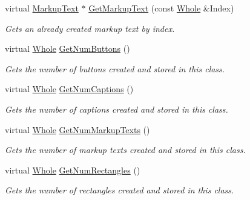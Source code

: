 \begin{DoxyCompactItemize}
virtual \hyperlink{classMezzanine_1_1UI_1_1MarkupText}{MarkupText} $\ast$ \hyperlink{classMezzanine_1_1UI_1_1RenderableContainerWidget_a7454e3b8a2864d207d30d143eb198df1}{GetMarkupText} (const \hyperlink{namespaceMezzanine_adcbb6ce6d1eb4379d109e51171e2e493}{Whole} \&Index)
\begin{DoxyCompactList}\small\item\em Gets an already created markup text by index. \item\end{DoxyCompactList}\item 
virtual \hyperlink{namespaceMezzanine_adcbb6ce6d1eb4379d109e51171e2e493}{Whole} \hyperlink{classMezzanine_1_1UI_1_1RenderableContainerWidget_a2d8dcbeee8b5dd7c344efe7589a5f4a9}{GetNumButtons} ()
\begin{DoxyCompactList}\small\item\em Gets the number of buttons created and stored in this class. \item\end{DoxyCompactList}\item 
virtual \hyperlink{namespaceMezzanine_adcbb6ce6d1eb4379d109e51171e2e493}{Whole} \hyperlink{classMezzanine_1_1UI_1_1RenderableContainerWidget_a3d2bed41ccc4e70cae464ec0c74de174}{GetNumCaptions} ()
\begin{DoxyCompactList}\small\item\em Gets the number of captions created and stored in this class. \item\end{DoxyCompactList}\item 
virtual \hyperlink{namespaceMezzanine_adcbb6ce6d1eb4379d109e51171e2e493}{Whole} \hyperlink{classMezzanine_1_1UI_1_1RenderableContainerWidget_af3b4ffb256a6adbe900cc7a1d8c4f342}{GetNumMarkupTexts} ()
\begin{DoxyCompactList}\small\item\em Gets the number of markup texts created and stored in this class. \item\end{DoxyCompactList}\item 
virtual \hyperlink{namespaceMezzanine_adcbb6ce6d1eb4379d109e51171e2e493}{Whole} \hyperlink{classMezzanine_1_1UI_1_1RenderableContainerWidget_ac7f19ba0b9eb60e413f2f2d2c1fadd42}{GetNumRectangles} ()
\begin{DoxyCompactList}\small\item\em Gets the number of rectangles created and stored in this class. \item\end{DoxyCompactList}\item 

\end{DoxyCompactItemize}

